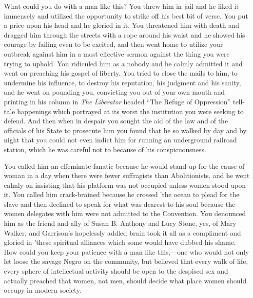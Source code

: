 \documentclass{book}
\begin{document}
What could you do with a man like this? You threw him in jail and he liked it immensely and utilized the opportunity to strike off his best bit of verse. You put a price upon his head and he gloried in it. You threatened him with death and dragged him through the streets with a rope around his waist and he showed his courage by failing even to be excited, and then went home to utilize your outbreak against him in a most effective sermon against the thing you were trying to uphold. You ridiculed him as a nobody and he calmly admitted it and went on preaching his gospel of liberty. You tried to close the mails to him, to undermine his influence, to destroy his reputation, his judgment and his sanity, and he went on pounding you, convicting you out of your own mouth and printing in his column in \emph{The Liberator} headed “The Refuge of Oppression” tell-tale happenings which portrayed at its worst the institution you were seeking to defend. And then when in despair you sought the aid of the law and of the officials of his State to prosecute him you found that he so walked by day and by night that you could not even indict him for running an underground railroad station, which he was careful not to because of his conspicuousness.

You called him an effeminate fanatic because he would stand up for the cause of woman in a day when there were fewer suffragists than Abolitionists, and he went calmly on insisting that his platform was not occupied unless women stood upon it. You called him crack-brained because he crossed ’the ocean to plead for the slave and then declined to speak for what was dearest to his soul because the women delegates with him were not admitted to the Convention. You denounced him as the friend and ally of Susan B. Anthony and Lucy Stone, yes, of Mary Walker, and Garrison’s hopelessly addled brain took it all as a compliment and gloried in ’these spiritual alliances which some would have dubbed his shame. How could you keep your patience with a man like this,—one who would not only let loose the savage Negro on the community, but believed that every walk of life, every sphere of intellectual activity should be open to the despised sex and actually preached that women, not men, should decide what place women should occupy in modern society.
\end{document}
